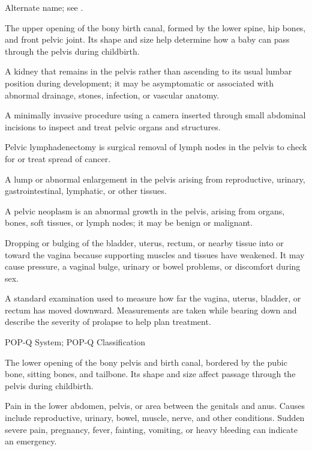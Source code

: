  Alternate name; see .

 The upper opening of the bony birth canal, formed by the lower spine, hip bones, and front pelvic joint. Its shape and size help determine how a baby can pass through the pelvis during childbirth.

 A kidney that remains in the pelvis rather than ascending to its usual lumbar position during development; it may be asymptomatic or associated with abnormal drainage, stones, infection, or vascular anatomy.

 A minimally invasive procedure using a camera inserted through small abdominal incisions to inspect and treat pelvic organs and structures.

 Pelvic lymphadenectomy is surgical removal of lymph nodes in the pelvis to check for or treat spread of cancer.

 A lump or abnormal enlargement in the pelvis arising from reproductive, urinary, gastrointestinal, lymphatic, or other tissues.

 A pelvic neoplasm is an abnormal growth in the pelvis, arising from organs, bones, soft tissues, or lymph nodes; it may be benign or malignant.

 Dropping or bulging of the bladder, uterus, rectum, or nearby tissue into or toward the vagina because supporting muscles and tissues have weakened. It may cause pressure, a vaginal bulge, urinary or bowel problems, or discomfort during sex.

 A standard examination used to measure how far the vagina, uterus, bladder, or rectum has moved downward. Measurements are taken while bearing down and describe the severity of prolapse to help plan treatment.

\synonyms
POP-Q System; POP-Q Classification

 The lower opening of the bony pelvis and birth canal, bordered by the pubic bone, sitting bones, and tailbone. Its shape and size affect passage through the pelvis during childbirth.

 Pain in the lower abdomen, pelvis, or area between the genitals and anus. Causes include reproductive, urinary, bowel, muscle, nerve, and other conditions. Sudden severe pain, pregnancy, fever, fainting, vomiting, or heavy bleeding can indicate an emergency.

